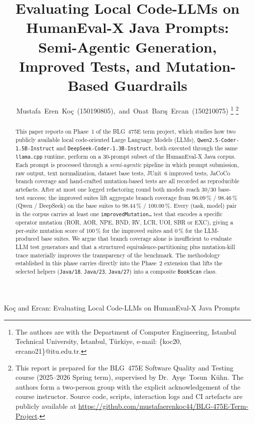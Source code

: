 \documentclass[journal]{IEEEtran}
\begin{document}
\title{Evaluating Local Code-LLMs on HumanEval-X Java Prompts:\\
Semi-Agentic Generation, Improved Tests, and Mutation-Based Guardrails}

\author{Mustafa~Eren~Ko\c{c}~(150190805),~and~Onat~Bar{\i}\c{s}~Ercan~(150210075)%
\thanks{The authors are with the Department of Computer Engineering,
Istanbul Technical University, Istanbul, T\"urkiye, e-mail:
\{koc20, ercano21\}@itu.edu.tr.}%
\thanks{This report is prepared for the BLG~475E Software Quality and
Testing course (2025--2026 Spring term), supervised by Dr.~Ay\c{s}e~Tosun~K\"uhn.
The authors form a two-person group with the explicit acknowledgement of the
course instructor. Source code, scripts, interaction logs and CI artefacts
are publicly available at \url{https://github.com/mustafaerenkoc44/BLG-475E-Term-Project}.}}

%
{Ko\c{c} and Ercan: Evaluating Local Code-LLMs on HumanEval-X Java Prompts}

\maketitle

\begin{abstract}
This paper reports on Phase~1 of the BLG~475E term project, which studies how
two publicly available local code-oriented Large Language Models (LLMs),
\texttt{Qwen2.5-Coder-1.5B-Instruct} and \texttt{DeepSeek-Coder-1.3B-Instruct},
both executed through the same \texttt{llama.cpp} runtime, perform on a
30-prompt subset of the HumanEval-X Java corpus. Each prompt is processed
through a \emph{semi-agentic} pipeline in which prompt submission, raw
output, text normalization, dataset base tests, JUnit~6 improved tests,
JaCoCo branch coverage and hand-crafted mutation-based tests are all
recorded as reproducible artefacts. After at most one logged refactoring
round both models reach $30/30$ base-test success; the improved suites lift
aggregate branch coverage from $96.09\,\%$ / $98.46\,\%$ (Qwen / DeepSeek)
on the base suites to $98.44\,\%$ / $100.00\,\%$. Every (task, model) pair
in the corpus carries at least one \texttt{improvedMutation\ldots} test
that encodes a specific operator mutation (ROR, AOR, NPE, BND, RV, LCR,
UOI, SBR or EXC), giving a per-suite mutation score of $100\,\%$ for the
improved suites and $0\,\%$ for the LLM-produced base suites. We argue
that branch coverage alone is insufficient to evaluate LLM test generators
and that a structured equivalence-partitioning plus mutation-kill trace
materially improves the transparency of the benchmark. The methodology
established in this phase carries directly into the Phase~2 extension that
lifts the selected helpers (\texttt{Java/18}, \texttt{Java/23},
\texttt{Java/27}) into a composite \texttt{BookScan} class.
\end{abstract}
\end{document}
